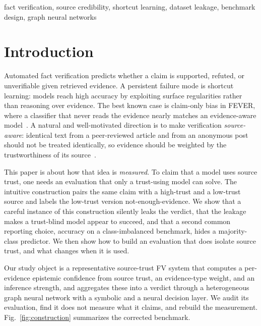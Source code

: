 \documentclass[conference]{IEEEtran}
\begin{document}
\begin{IEEEkeywords}
fact verification, source credibility, shortcut learning, dataset leakage, benchmark design, graph neural networks
\end{IEEEkeywords}

\section{Introduction}
Automated fact verification predicts whether a claim is supported, refuted, or unverifiable given retrieved evidence. A persistent failure mode is shortcut learning: models reach high accuracy by exploiting surface regularities rather than reasoning over evidence. The best known case is claim-only bias in FEVER, where a classifier that never reads the evidence nearly matches an evidence-aware model~\cite{schuster2019debias}. A natural and well-motivated direction is to make verification \emph{source-aware}: identical text from a peer-reviewed article and from an anonymous post should not be treated identically, so evidence should be weighted by the trustworthiness of its source~\cite{popat2018declare,baly2018factuality}.

This paper is about how that idea is \emph{measured}. To claim that a model uses source trust, one needs an evaluation that only a trust-using model can solve. The intuitive construction pairs the same claim with a high-trust and a low-trust source and labels the low-trust version not-enough-evidence. We show that a careful instance of this construction silently leaks the verdict, that the leakage makes a trust-blind model appear to succeed, and that a second common reporting choice, accuracy on a class-imbalanced benchmark, hides a majority-class predictor. We then show how to build an evaluation that does isolate source trust, and what changes when it is used.

Our study object is a representative source-trust FV system that computes a per-evidence epistemic confidence from source trust, an evidence-type weight, and an inference strength, and aggregates these into a verdict through a heterogeneous graph neural network with a symbolic and a neural decision layer. We audit its evaluation, find it does not measure what it claims, and rebuild the measurement. Fig.~\ref{fig:construction} summarizes the corrected benchmark.
\end{document}
